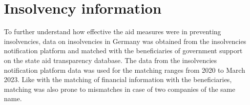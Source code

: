 
\section{Insolvency information}

To further understand how effective the aid measures were in preventing insolvencies, data on insolvencies in Germany was obtained from the insolvencies notification platform and matched with the beneficiaries of government support on the state aid transparency database. 
The data from the insolvencies notification platform data was used for the matching ranges from 2020 to March 2023. Like with the matching of financial information with the beneficiaries, matching was also prone to mismatches in case of two companies of the same name.

